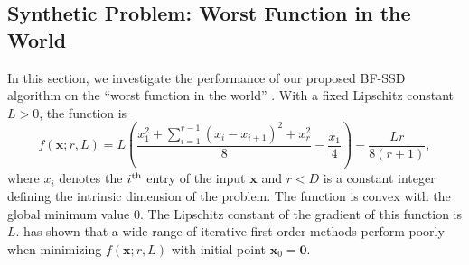 \documentclass[10pt]{article} %
\numberwithin{equation}{section}
\theoremstyle{plain}
\theoremstyle{definition}
\newcommand{\<}{\langle}
\renewcommand{\>}{\rangle}
\renewcommand{\(}{\left(}
\renewcommand{\)}{\right)}
\renewcommand{\[}{\left[}
\renewcommand{\]}{\right]}
\newcommand{\Lip}{L}
\begin{document}
\subsection{Synthetic Problem: Worst Function in the World}
\label{ssec:worst-function}
In this section, we investigate the performance of our proposed BF-SSD algorithm on the ``worst function in the world'' \citep{nesterov2013introductory}. With a fixed Lipschitz constant $\Lip > 0$, the function is
\begin{equation}
\label{eq:worst-function-def}
f(\bm x; r, \Lip) = \Lip\left(\frac{x_1^2+\sum_{i=1}^{r-1}(x_i - x_{i+1})^2 + x_r^2}{8} - \frac{x_1}{4}\right) - \frac{\Lip r}{8(r+1)},
\end{equation}
where $x_i$ denotes the $i^\textup{th}$ entry of the input $\bm x$ and $r < D$ is a constant integer defining the intrinsic dimension of the problem. The function is convex with the global minimum value $0$. The Lipschitz constant of the gradient of this function is $\Lip$. \citet{nesterov2013introductory} has shown that a wide range of iterative first-order methods perform poorly when minimizing $f(\bm x;r,\Lip)$ with initial point $\bm x_0 = \bm 0$. 
\end{document}

